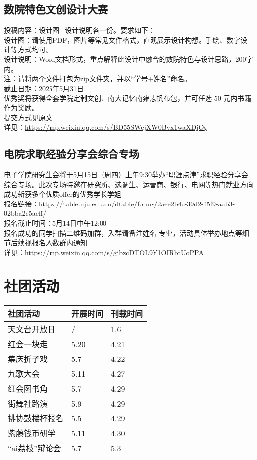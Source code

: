 \documentclass[letterpaper, 12pt]{article}
\begin{document}
\begin{multicols}{2}
\subsection{数院特色文创设计大赛} %
投稿内容：设计图+设计说明各一份。要求如下：
\\设计图：请使用PDF，图片等常见文件格式，直观展示设计构想。手绘、数字设计等方式均可。
\\设计说明：Word文档形式，重点解释此设计中融合的数院特色与设计思路，200字内。
\\注：请将两个文件打包为zip文件夹，并以“学号+姓名”命名。
\\截止日期：2025年5月31日
\\优秀奖将获得全套学院定制文创、南大记忆南雍志帆布包，并可任选 50 元内书籍作为奖励。
\\提交方式见原文
\\详见：\url{https://mp.weixin.qq.com/s/BD55SWejXW0Bvx1waXDjOg}

\subsection{电院求职经验分享会综合专场} %
电子学院研究生会将于5月15日（周四）上午9:30举办“职涯点津”求职经验分享会综合专场。此次专场特邀在研究所、选调生、运营商、银行、电网等热门就业方向成功斩获多个优质offer的优秀学长学姐
\\报名链接：https://table.nju.edu.cn/dtable/forms/2aee2b4c-39d2-45f9-aab3-02bba2c5aeff/
\\报名截止时间：5月14日中午12:00
\\报名成功的同学扫描二维码加群，入群请备注姓名-专业，活动具体举办地点等细节后续视报名人数群内通知
\\详见：\url{https://mp.weixin.qq.com/s/gjbzcDTOL9Y1OIRbtUoPPA}

\section{社团活动}
\begin{tabular}{|>{\centering\arraybackslash}m{}|m{}|m{}|}
    \hline
    社团活动 & 开展时间 & 刊载时间\\
    \hline\hline
    天文台开放日 & / & 1.6\\
    红会一块走 & 5.20 & 4.21\\
    集庆折子戏 & 5.7 & 4.22\\
    九歌大会 & 5.11 & 4.27\\
    红会图书角 & 5.7 & 4.29\\
    街舞社路演 & 5.9 & 4.29\\
    排协鼓楼杯报名 & 5.5 & 4.29\\
    紫藤钱币研学 & 5.11 & 4.30\\
    “ai荔枝”辩论会 & 5.7 & 5.3\\
    \hline
\end{tabular}

\end{multicols}
\end{document}

